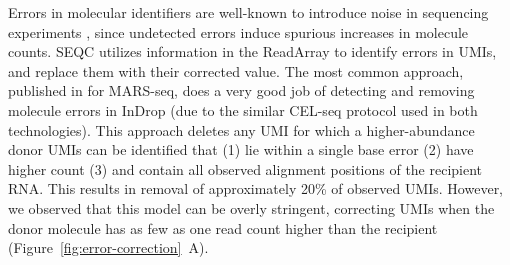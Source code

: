 Errors in molecular identifiers are well-known to introduce noise in sequencing experiments \citep{Jaitin2014}, since undetected errors induce spurious increases in molecule counts. 
SEQC utilizes information in the ReadArray to identify errors in UMIs, and replace them with their corrected value. 
The most common approach, published in \citep{Jaitin2014} for MARS-seq, does a very good job of detecting and removing molecule errors in InDrop (due to the similar CEL-seq protocol used in both technologies). 
This approach deletes any UMI for which a higher-abundance donor UMIs can be identified that (1) lie within a single base error (2) have higher count (3) and contain all observed alignment positions of the recipient RNA\@. 
This results in removal of approximately 20\% of observed UMIs. 
However, we observed that this model can be overly stringent, correcting UMIs when the donor molecule has as few as one read count higher than the recipient (Figure~\ref{fig:error-correction}~A). 

